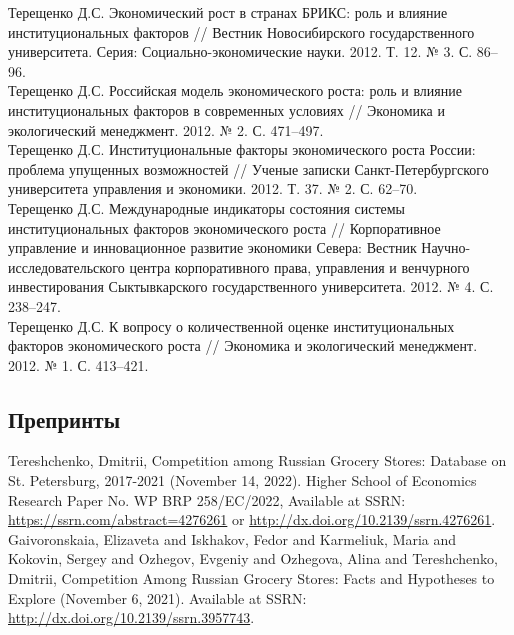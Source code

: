 \documentclass[10pt]{article}
\newcommand{\years}[1]{\marginnote{\scriptsize #1}}
\begin{document}
\years{2012}Терещенко Д.С. Экономический рост в странах БРИКС: роль и влияние институциональных факторов // Вестник Новосибирского государственного университета. Серия: Социально-экономические науки. 2012. Т. 12. № 3. С. 86–96.\\
\years{2012}Терещенко Д.С. Российская модель экономического роста: роль и влияние институциональных факторов в современных условиях // Экономика и экологический менеджмент. 2012. № 2. С. 471–497.\\
\years{2012}Терещенко Д.С. Институциональные факторы экономического роста России: проблема упущенных возможностей // Ученые записки Санкт-Петербургского университета управления и экономики. 2012. Т. 37. № 2. С. 62–70.\\
\years{2012}Терещенко Д.С. Международные индикаторы состояния системы институциональных факторов экономического роста // Корпоративное управление и инновационное развитие экономики Севера: Вестник Научно-исследовательского центра корпоративного права, управления и венчурного инвестирования Сыктывкарского государственного университета. 2012. № 4. С. 238–247.\\
\years{2012}Терещенко Д.С. К вопросу о количественной оценке институциональных факторов экономического роста // Экономика и экологический менеджмент. 2012. № 1. С. 413–421.\\

\subsection*{Препринты}
\noindent
\years{2022}Tereshchenko, Dmitrii, Competition among Russian Grocery Stores: Database on St. Petersburg, 2017-2021 (November 14, 2022). Higher School of Economics Research Paper No. WP BRP 258/EC/2022, Available at SSRN: \url{https://ssrn.com/abstract=4276261} or \url{http://dx.doi.org/10.2139/ssrn.4276261}.\\
\years{2021}Gaivoronskaia, Elizaveta and Iskhakov, Fedor and Karmeliuk, Maria and Kokovin, Sergey and Ozhegov, Evgeniy and Ozhegova, Alina and Tereshchenko, Dmitrii, Competition Among Russian Grocery Stores: Facts and Hypotheses to Explore (November 6, 2021). Available at SSRN: \url{http://dx.doi.org/10.2139/ssrn.3957743}. 
\end{document}
